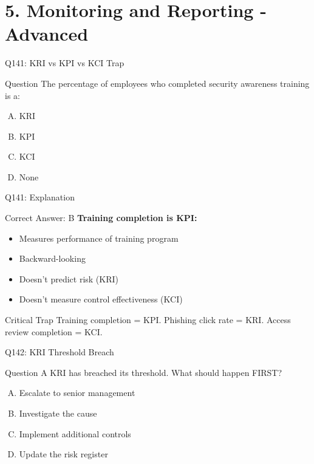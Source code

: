 \documentclass{beamer}
\begin{document}
	
	\section{5. Monitoring and Reporting - Advanced}
	
	\begin{frame}{Q141: KRI vs KPI vs KCI Trap}
		\begin{block}{Question}
			The percentage of employees who completed security awareness training is a:
		\end{block}
		\begin{enumerate}[(A)]
			\item KRI
			\item KPI
			\item KCI
			\item None
		\end{enumerate}
	\end{frame}
	
	\begin{frame}{Q141: Explanation}
		\begin{block}{Correct Answer: B}
			\textbf{Training completion is KPI:}
			\begin{itemize}
				\item Measures performance of training program
				\item Backward-looking
				\item Doesn't predict risk (KRI)
				\item Doesn't measure control effectiveness (KCI)
			\end{itemize}
		\end{block}
		\begin{alertblock}{Critical Trap}
			Training completion = KPI.
			Phishing click rate = KRI.
			Access review completion = KCI.
		\end{alertblock}
	\end{frame}
	
	\begin{frame}{Q142: KRI Threshold Breach}
		\begin{block}{Question}
			A KRI has breached its threshold. What should happen FIRST?
		\end{block}
		\begin{enumerate}[(A)]
			\item Escalate to senior management
			\item Investigate the cause
			\item Implement additional controls
			\item Update the risk register
		\end{enumerate}
	\end{frame}
	
\end{document}
